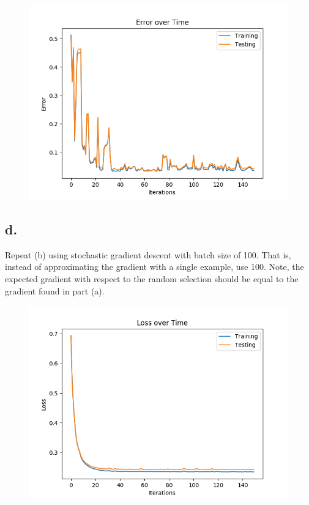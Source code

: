 \documentclass{article}
\newcommand{\1}{\mathbf{1}}
\begin{document}
{\begin{figure}[hb]
  \centering
  \includegraphics[width=150mm]{../hw2-code/results/a6_cii.png}
\end{figure}

\subsection*{d.}

Repeat (b) using stochastic gradient descent with batch size of 100. That is, instead of approximating the gradient with a single example, use 100. Note, the expected gradient with respect to the random selection should be equal to the gradient found in part (a).

\begin{figure}[hb]
  \centering
  \includegraphics[width=150mm]{../hw2-code/results/a6_di.png}
\end{figure}

}
\end{document}
